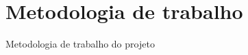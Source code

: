 %
%
\chapter{Metodologia de trabalho} \label{chp:metodologia}

Metodologia de trabalho do projeto


